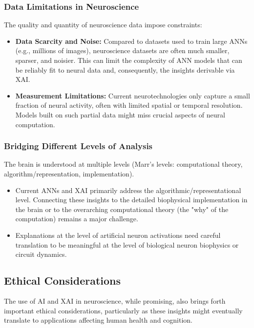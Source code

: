 \documentclass[11pt,a4paper]{article}
\begin{document}
\subsubsection{Data Limitations in Neuroscience}
The quality and quantity of neuroscience data impose constraints:
\begin{itemize}
    \item \textbf{Data Scarcity and Noise:} Compared to datasets used to train large ANNs (e.g., millions of images), neuroscience datasets are often much smaller, sparser, and noisier. This can limit the complexity of ANN models that can be reliably fit to neural data and, consequently, the insights derivable via XAI.
    \item \textbf{Measurement Limitations:} Current neurotechnologies only capture a small fraction of neural activity, often with limited spatial or temporal resolution. Models built on such partial data might miss crucial aspects of neural computation.
\end{itemize}

\subsubsection{Bridging Different Levels of Analysis}
The brain is understood at multiple levels (Marr's levels: computational theory, algorithm/representation, implementation).
\begin{itemize}
    \item Current ANNs and XAI primarily address the algorithmic/representational level. Connecting these insights to the detailed biophysical implementation in the brain or to the overarching computational theory (the "why" of the computation) remains a major challenge.
    \item Explanations at the level of artificial neuron activations need careful translation to be meaningful at the level of biological neuron biophysics or circuit dynamics.
\end{itemize}

\subsection{Ethical Considerations}

The use of AI and XAI in neuroscience, while promising, also brings forth important ethical considerations, particularly as these insights might eventually translate to applications affecting human health and cognition.
\end{document}
